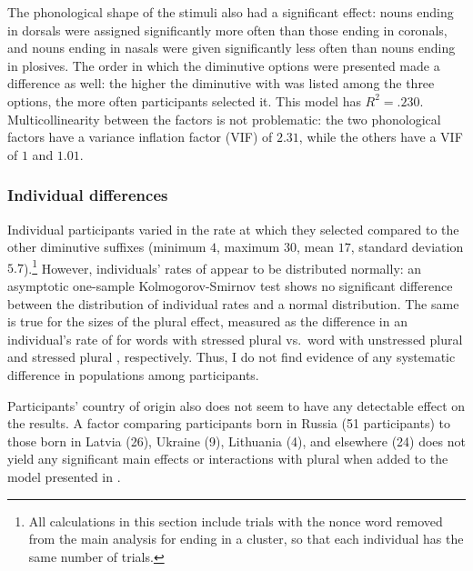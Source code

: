 \documentclass[output=paper,colorlinks,citecolor=brown
]{langscibook}
\begin{document}
The phonological shape of the stimuli also had a significant effect: nouns ending in dorsals were assigned \ok{} significantly more often than those ending in coronals, and nouns ending in nasals were given \ok{} significantly less often than nouns ending in plosives. The order in which the diminutive options were presented made a difference as well: the higher the diminutive with \ok{} was listed among the three options, the more often participants selected it. This model has $R^2=.230$. Multicollinearity between the factors is not problematic: the two phonological factors have a variance inflation factor (VIF) of $2.31$, while the others have a VIF of $1$ and $1.01$. %

\subsubsection{Individual differences}
Individual participants varied in the rate at which they selected \ok{} compared to the other diminutive suffixes (minimum $4$, maximum $30$, mean $17$, standard deviation $5.7$).\footnote{All calculations in this section include trials with the nonce word removed from the main analysis for ending in a cluster, so that each individual has the same number of trials.} However, individuals' rates of \ok{} appear to be distributed normally: an asymptotic one-sample Kolmogorov-Smirnov test \citep{Massey1951} shows no significant difference between the distribution of individual \ok{} rates and a normal distribution. The same is true for the sizes of the plural effect, measured as the difference in an individual's rate of \ok{} for words with stressed plural \plsi{} vs.\ word with unstressed plural \pli{} and stressed plural \pla, respectively. Thus, I do not find evidence of any systematic difference in populations among participants.

Participants' country of origin also does not seem to have any detectable effect on the results. A factor comparing participants born in Russia (51 participants) to those born in Latvia (26), Ukraine (9), Lithuania (4), and elsewhere (24) does not yield any significant main effects or interactions with plural when added to the model presented in .
\end{document}
